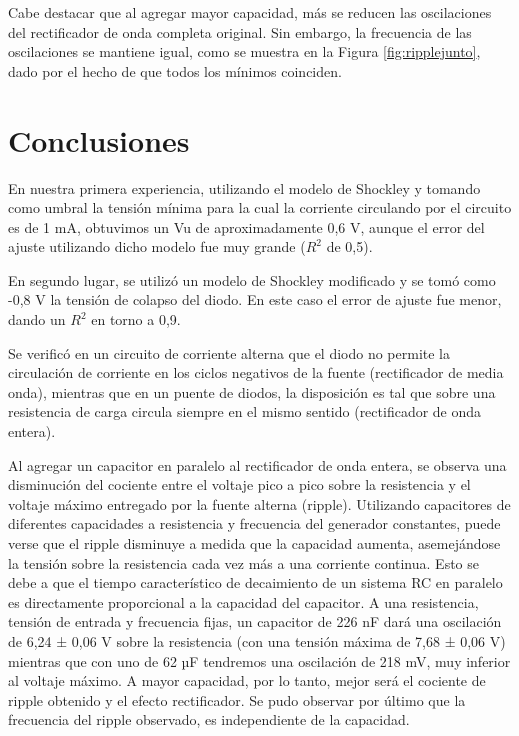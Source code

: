 \documentclass[twoside,twocolumn,a4paper]{article}
\begin{document}
Cabe destacar que al agregar mayor capacidad, m\'as se reducen las oscilaciones del rectificador de onda completa original. Sin embargo, la frecuencia de las oscilaciones se mantiene igual, como se muestra en la Figura \ref{fig:ripplejunto}, dado por el hecho de que todos los m\'inimos coinciden. 



\section{Conclusiones}
En nuestra primera experiencia, utilizando el modelo de Shockley y tomando como umbral la tensi\'on m\'inima para la cual la corriente circulando por el circuito es de 1 mA, obtuvimos un Vu de aproximadamente 0,6 V, aunque el error del ajuste utilizando dicho modelo fue muy grande ($R^2$ de 0,5).

En segundo lugar, se utiliz\'o un modelo de Shockley modificado y se tom\'o como -0,8 V la tensi\'on de colapso del diodo. En este caso el error de ajuste fue menor, dando un $R^2$ en torno a 0,9.

Se verific\'o en un circuito de corriente alterna que el diodo no permite la circulaci\'on de corriente en los ciclos negativos de la fuente (rectificador de media onda), mientras que en un puente de diodos, la disposici\'on es tal que sobre una resistencia de carga circula siempre en el mismo sentido (rectificador de onda entera).

Al agregar un capacitor en paralelo al rectificador de onda entera, se observa una disminuci\'on del cociente entre el voltaje pico a pico sobre la resistencia y el voltaje m\'aximo entregado por la fuente alterna (ripple). Utilizando capacitores de diferentes capacidades a resistencia y frecuencia del generador constantes, puede verse que el ripple disminuye a medida que la capacidad aumenta, asemej\'andose la tensi\'on sobre la resistencia cada vez m\'as a una corriente continua. Esto se debe a que el tiempo caracter\'istico de decaimiento de un sistema RC en paralelo es directamente proporcional a la capacidad del capacitor. A una resistencia, tensi\'on de entrada y frecuencia fijas, un capacitor de 226 nF dar\'a una oscilaci\'on de 6,24 ± 0,06 V sobre la resistencia (con una tensi\'on m\'axima de 7,68 ± 0,06 V) mientras que con uno de 62 µF tendremos una oscilaci\'on de 218 mV, muy inferior al voltaje m\'aximo. A mayor capacidad, por lo tanto, mejor ser\'a el cociente de ripple obtenido y el efecto rectificador. Se pudo observar por \'ultimo que la frecuencia del ripple observado, es independiente de la capacidad. 
\end{document}
